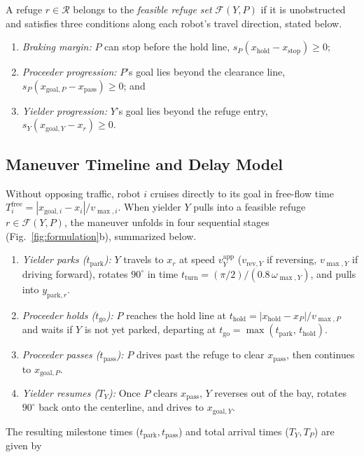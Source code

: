 A refuge $r \in \mathcal{R}$ belongs to the \emph{feasible refuge set} $\mathcal{F}(Y, P)$ if it is unobstructed and satisfies three conditions along each robot's travel direction, stated below.
\begin{enumerate}
\item \emph{Braking margin:} $P$ can stop before the hold line, $s_P(x_{\mathrm{hold}} - x_{\mathrm{stop}}) \ge 0$;
\item \emph{Proceeder progression:} $P$'s goal lies beyond the clearance line, $s_P(x_{\mathrm{goal},P} - x_{\mathrm{pass}}) \ge 0$; and
\item \emph{Yielder progression:} $Y$'s goal lies beyond the refuge entry, $s_Y(x_{\mathrm{goal},Y} - x_r) \ge 0$.
\end{enumerate}

\subsection{Maneuver Timeline and Delay Model}
Without opposing traffic, robot $i$ cruises directly to its goal in free-flow time $T_i^{\mathrm{free}} = |x_{\mathrm{goal},i} - x_i| / v_{\max,i}$.
When yielder $Y$ pulls into a feasible refuge $r \in \mathcal{F}(Y, P)$, the maneuver unfolds in four sequential stages (Fig.~\ref{fig:formulation}b), summarized below.
\begin{enumerate}
\item \emph{Yielder parks ($t_{\mathrm{park}}$):} $Y$ travels to $x_r$ at speed $v_Y^{\mathrm{app}}$ ($v_{\mathrm{rev},Y}$ if reversing, $v_{\max,Y}$ if driving forward), rotates $90^\circ$ in time $t_{\mathrm{turn}} = (\pi/2)/(0.8\,\omega_{\max,Y})$, and pulls into $y_{\mathrm{park},r}$.
\item \emph{Proceeder holds ($t_{\mathrm{go}}$):} $P$ reaches the hold line at $t_{\mathrm{hold}} = |x_{\mathrm{hold}} - x_P| / v_{\max,P}$ and waits if $Y$ is not yet parked, departing at $t_{\mathrm{go}} = \max(t_{\mathrm{park}},\, t_{\mathrm{hold}})$.
\item \emph{Proceeder passes ($t_{\mathrm{pass}}$):} $P$ drives past the refuge to clear $x_{\mathrm{pass}}$, then continues to $x_{\mathrm{goal},P}$.
\item \emph{Yielder resumes ($T_Y$):} Once $P$ clears $x_{\mathrm{pass}}$, $Y$ reverses out of the bay, rotates $90^\circ$ back onto the centerline, and drives to $x_{\mathrm{goal},Y}$.
\end{enumerate}
The resulting milestone times ($t_{\mathrm{park}}, t_{\mathrm{pass}}$) and total arrival times ($T_Y, T_P$) are given by
